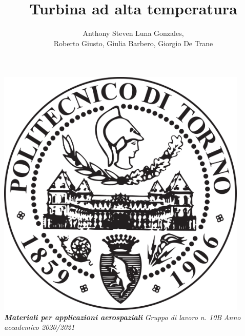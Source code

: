 \documentclass{article}
\author{Anthony Steven Luna Gonzales, \\Roberto Giusto, Giulia Barbero, Giorgio De Trane}
\title{\textbf{Turbina ad alta temperatura}}
\begin{document}
    \maketitle
    \begin{center}
        \includegraphics[width=0.9\textwidth]{Sources/polito_logo.png}\linebreak\newline
       \textbf{\textit{Materiali per applicazioni aerospaziali}}\linebreak\newline
        \textit{Gruppo di lavoro n. 10B}\linebreak\newline
        \textit{Anno accademico 2020/2021}
    \end{center}

    \newpage
    \tableofcontents
    \newpage
\end{document}
